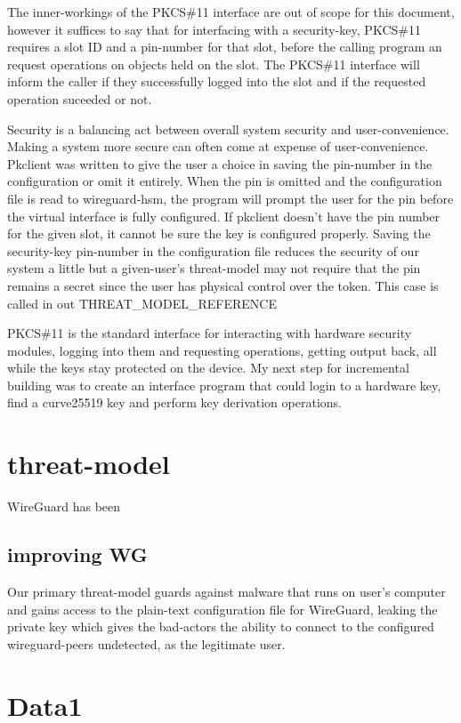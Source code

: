 \documentclass [11pt, proquest] {uwthesis}[2020/02/24]
\begin{document}
The inner-workings of the PKCS\#11 interface are out of scope for this document, however it suffices to say that for interfacing with a security-key, PKCS\#11 requires a slot ID and a pin-number for that slot, before the calling program an request operations on objects held on the slot. The PKCS\#11 interface will inform the caller if they successfully logged into the slot and if the requested operation suceeded or not.

Security is a balancing act between overall system security and user-convenience. Making a system more secure can often come at expense of user-convenience. Pkclient was written to give the user a choice in saving the pin-number in the configuration or omit it entirely. When the pin is omitted and the configuration file is read to wireguard-hsm, the program will prompt the user for the pin before the virtual interface is fully configured. If pkclient doesn't have the pin number for the given slot, it cannot be sure the key is configured properly. Saving the security-key pin-number in the configuration file reduces the security of our system a little but a given-user's threat-model may not require that the pin remains a secret since the user has physical control over the token. This case is called in out THREAT_MODEL_REFERENCE


PKCS\#11 is the standard interface for interacting with hardware security modules, logging into them and requesting operations, getting output back, all while the keys stay protected on the device.
My next step for incremental building was to create an interface program that could login to a hardware key, find a curve25519 key and perform key derivation operations.

\chapter {threat-model}
WireGuard has been
\section{improving WG}
Our primary threat-model guards against malware that runs on user's computer and gains access to the plain-text configuration file for WireGuard, leaking the private key which gives the bad-actors the ability to connect to the configured wireguard-peers undetected, as the legitimate user.

\chapter {Data1}
\end{document}
